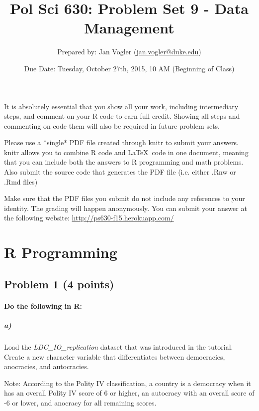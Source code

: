 \documentclass[12pt]{article}
\begin{document}
\title{Pol Sci 630: Problem Set 9 - Data Management}

\author{Prepared by: Jan Vogler (\href{mailto:jan.vogler@duke.edu}{jan.vogler@duke.edu})}

\date{Due Date: Tuesday, October 27th, 2015, 10 AM (Beginning of Class)}
 
\maketitle 



It is absolutely essential that you show all your work, including intermediary steps, and comment on your R code to earn full credit. Showing all steps and commenting on code them will also be required in future problem sets.

Please use a *single* PDF file created through knitr to submit your answers. knitr allows you to combine R code and \LaTeX \ code in one document, meaning that you can include both the answers to R programming and math problems. Also submit the source code that generates the PDF file (i.e. either .Rnw or .Rmd files)

Make sure that the PDF files you submit do not include any references to your identity. The grading will happen anonymously. You can submit your answer at the following website: \url{http://ps630-f15.herokuapp.com/}



\section*{R Programming}

\subsection*{Problem 1 (4 points)}

\paragraph{Do the following in R:}

\subparagraph{a)} Load the \textit{LDC\_IO\_replication} dataset that was introduced in the tutorial. Create a new character variable that differentiates between democracies, anocracies, and autocracies.

Note: According to the Polity IV classification, a country is a democracy when it has an overall Polity IV score of 6 or higher, an autocracy with an overall score of -6 or lower, and anocracy for all remaining scores.
\end{document}
